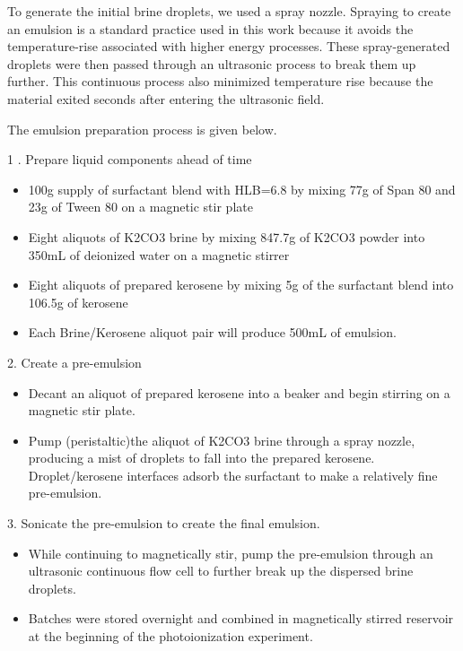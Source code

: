 To generate the initial brine droplets, we used a spray nozzle. Spraying to create an emulsion is a standard practice \cite{atkinsonKeroseneEmulsionHow1890} used in this work because it avoids the temperature-rise associated with higher energy processes. These spray-generated droplets were then passed through an ultrasonic process to break them up further. This continuous process also minimized temperature rise because the material exited seconds after entering the ultrasonic field. 

The emulsion preparation process is given below. 

1 . Prepare liquid components ahead of time 
  \begin{itemize}
  \item 100g supply of surfactant blend with HLB=6.8 by mixing 77g of Span 80 and 23g of Tween 80 on a magnetic stir plate 

  \item Eight aliquots of K2CO3 brine by mixing 847.7g of K2CO3 powder into 350mL of deionized water on a magnetic stirrer 

  \item Eight aliquots of prepared kerosene by mixing 5g of the surfactant blend into 106.5g of kerosene  

  \item Each Brine/Kerosene aliquot pair will produce 500mL of emulsion. 
  \end{itemize}


2. Create a pre-emulsion 

  \begin{itemize}
    
  \item Decant an aliquot of prepared kerosene into a beaker and begin stirring on a magnetic stir plate. 

  \item Pump (peristaltic)the aliquot of K2CO3 brine through a spray nozzle, producing a mist of droplets to fall into the prepared kerosene. Droplet/kerosene interfaces adsorb the surfactant to make a relatively fine pre-emulsion. 

  \end{itemize}

3. Sonicate the pre-emulsion to create the final emulsion. 

  \begin{itemize}

  \item While continuing to magnetically stir, pump the pre-emulsion through an ultrasonic continuous flow cell to further break up the dispersed brine droplets. 

  \item Batches were stored overnight and combined in magnetically stirred reservoir at the beginning of the photoionization experiment. 
  \end{itemize}

